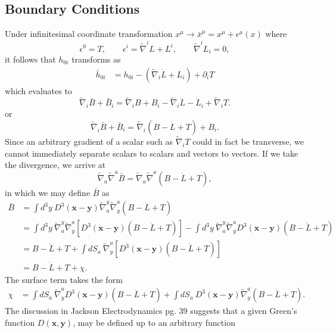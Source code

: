 \documentclass[10pt,letterpaper]{article}
\numberwithin{equation}{subsection}
\begin{document}
\subsection{Boundary Conditions}
Under infinitesimal coordinate transformation $x^\mu \to \bar x^\mu = x^\mu + \epsilon^\mu(x)$
where
\[
	\epsilon^0 = T,\qquad \epsilon^i = \tilde\nabla^i L + L^i,\qquad \tilde\nabla^i L_i = 0,
\]
it follows that $h_{0i}$ transforms as 
\begin{align}
 \bar h_{0i} &=  h_{0i} -  (\tilde\nabla_i \dot L + L_i) +  \partial_i T
\end{align}
which evaluates to
\begin{equation}
	\tilde \nabla_i \bar B + \bar B_i = \tilde\nabla_i B + B_i - \tilde\nabla_i \dot L - \dot L_i + \tilde\nabla_i T.
\end{equation}
or
\begin{equation}
\tilde\nabla_i \bar B + \bar B_i = \tilde\nabla_i(B - \dot L + T) + B_i.
\end{equation}
Since an arbitrary gradient of a scalar such as $\tilde\nabla_i T$ could in fact be transverse, we cannot immediately separate scalars to scalars and vectors to vectors. If we take the divergence, we arrive at
\begin{equation}
\tilde\nabla_a \tilde\nabla^a \bar B = \tilde\nabla_a \tilde\nabla^a (B-\dot L + T),
\end{equation}
in which we may define $\bar B$ as
\begin{align}
\bar B&= \int d^3y\ D^3(\mathbf x - \mathbf y)\tilde\nabla_a^y \tilde\nabla^a_y(B-\dot L + T)
\nonumber\\
&= \int d^3y\  \tilde\nabla_a^y \tilde\nabla^a_y\left[ D^3(\mathbf x - \mathbf y)(B-\dot L + T)\right] - \int d^3y \  \tilde\nabla_a^y \tilde\nabla^a_y D^3(\mathbf x - \mathbf y)(B-\dot L + T)
\nonumber\\
&= B-\dot L + T + \int dS_a\  \tilde\nabla^a_y\left[ D^3(\mathbf x - \mathbf y)(B-\dot L + T)\right]
\nonumber\\
&= B - \dot L + T + \chi.
\end{align}
The surface term takes the form
\begin{align}
\chi &=  \int dS_a\   \tilde\nabla^a_yD^3(\mathbf x - \mathbf y)(B-\dot L + T) + \int dS_a\  D^3(\mathbf x - \mathbf y)\tilde\nabla^a_y(B-\dot L + T).
\end{align}
The discussion in Jackson Electrodynamics pg. 39 suggests that a given Green's function $D(\mathbf x, \mathbf y)$, may be defined up to an arbitrary function 
\end{document}
